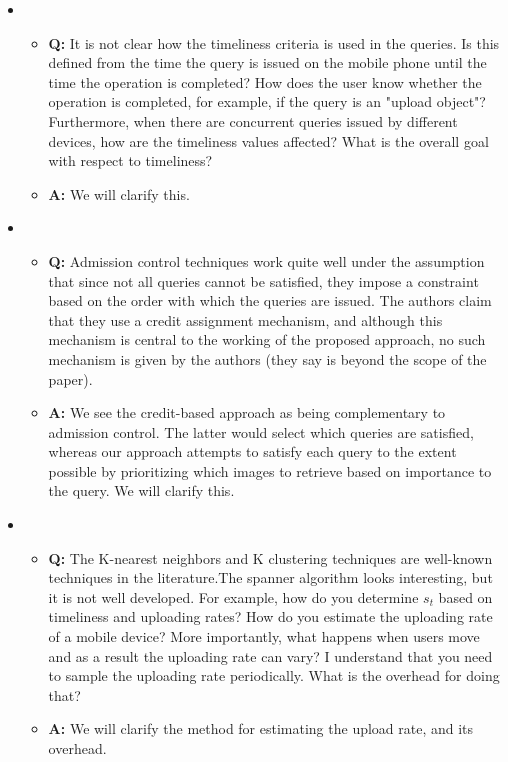 \begin{itemize}
\item
\begin{itemize}
\item \textbf{Q: }It is not clear how the timeliness criteria is used
  in the queries.  Is this defined from the time the query is issued
  on the mobile phone until the time the operation is completed? How
  does the user know whether the operation is completed, for example,
  if the query is an "upload object"?  Furthermore, when there are
  concurrent queries issued by different devices, how are the
  timeliness values affected?  What is the overall goal with respect
  to timeliness?
\item \textbf{A: }We will clarify this.
\end{itemize}


\item
\begin{itemize}
\item \textbf{Q: }Admission control techniques work quite well under
  the assumption that since not all queries cannot be satisfied, they
  impose a constraint based on the order with which the queries are
  issued.  The authors claim that they use a credit assignment
  mechanism, and although this mechanism is central to the working of
  the proposed approach, no such mechanism is given by the authors
  (they say is beyond the scope of the paper).
\item \textbf{A: } We see the credit-based approach as being
  complementary to admission control. The latter would select which
  queries are satisfied, whereas our approach attempts to satisfy each
  query to the extent possible by prioritizing which images to
  retrieve based on importance to the query. We will clarify this.
\end{itemize}
   
\item
\begin{itemize}
\item \textbf{Q: }The K-nearest neighbors and K clustering techniques
  are well-known techniques in the literature.The spanner algorithm
  looks interesting, but it is not well developed.  For example, how
  do you determine $s_t$ based on timeliness and uploading rates?  How
  do you estimate the uploading rate of a mobile device? More
  importantly, what happens when users move and as a result the
  uploading rate can vary?  I understand that you need to sample the
  uploading rate periodically.  What is the overhead for doing that?
\item \textbf{A: }We will clarify the method for estimating the
  upload rate, and its overhead.
  \end{itemize}
  

\end{itemize}
